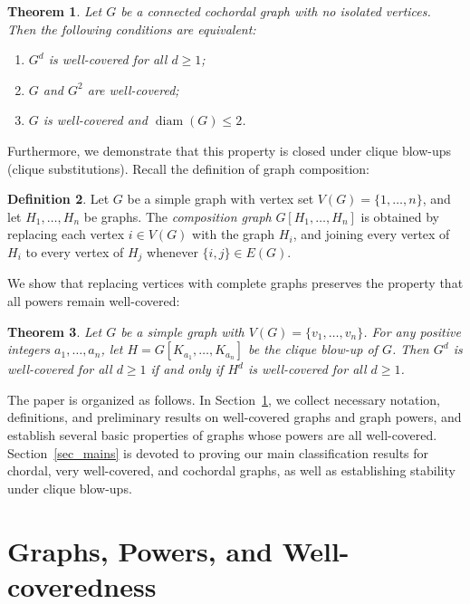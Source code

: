 \documentclass[10pt,a4paper]{amsart}
\numberwithin{equation}{section}
\newtheorem{thm}{\bf Theorem}[section]
\theoremstyle{definition}
\newtheorem{defn}[thm]{Definition}
\begin{document}
\begin{thm}\label{thm_cochor}
Let $G$ be a connected cochordal graph with no isolated vertices. Then the following conditions are equivalent:
\begin{enumerate}
    \item $G^d$ is well-covered for all $d \ge 1$;
    \item $G$ and $G^2$ are well-covered;
    \item $G$ is well-covered and $\operatorname{diam}(G) \le 2$.
\end{enumerate}
\end{thm}


Furthermore, we demonstrate that this property is closed under clique blow-ups (clique substitutions). Recall the definition of graph composition:

\begin{defn}
Let $G$ be a simple graph with vertex set $V(G) = \{1, \ldots, n\}$, and let $H_1, \ldots, H_n$ be graphs. The \emph{composition graph} $G[H_1, \ldots, H_n]$ is obtained by replacing each vertex $i \in V(G)$ with the graph $H_i$, and joining every vertex of $H_i$ to every vertex of $H_j$ whenever $\{i, j\} \in E(G)$.
\end{defn}

We show that replacing vertices with complete graphs preserves the property that all powers remain well-covered:

\begin{thm}\label{thm_clique_blowup}
Let $G$ be a simple graph with $V(G) = \{v_1, \ldots, v_n\}$. For any positive integers $a_1, \ldots, a_n$, let $H = G[K_{a_1}, \ldots, K_{a_n}]$ be the clique blow-up of $G$. Then $G^d$ is well-covered for all $d \ge 1$ if and only if $H^d$ is well-covered for all $d \ge 1$.
\end{thm}

The paper is organized as follows. In Section~\ref{sec_prelim}, we collect necessary notation, definitions, and preliminary results on well-covered graphs and graph powers, and establish several basic properties of graphs whose powers are all well-covered. Section~\ref{sec_mains} is devoted to proving our main classification results for chordal, very well-covered, and cochordal graphs, as well as establishing stability under clique blow-ups.

\section{Graphs, Powers, and Well-coveredness}\label{sec_prelim}
\end{document}
